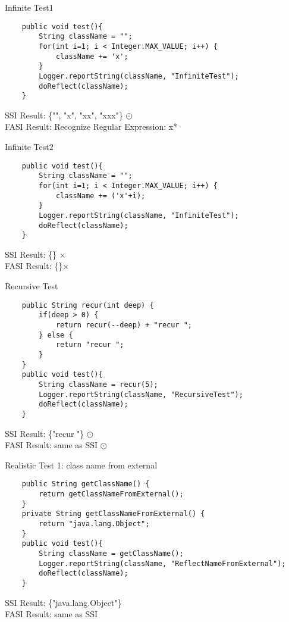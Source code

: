 \documentclass{beamer}
\begin{document}
\begin{frame}[fragile]{Infinite Test1}
\begin{lstlisting}
    public void test(){
        String className = "";
        for(int i=1; i < Integer.MAX_VALUE; i++) {
            className += 'x';
        }
        Logger.reportString(className, "InfiniteTest");
        doReflect(className);
    }
\end{lstlisting}
SSI Result: \{"", "x", "xx", "xxx"\} $\odot$\\
FASI Result: Recognize Regular Expression: x*  \checkmark
\end{frame}

\begin{frame}[fragile]{Infinite Test2}
\begin{lstlisting}
    public void test(){
        String className = "";
        for(int i=1; i < Integer.MAX_VALUE; i++) {
            className += ('x'+i);
        }
        Logger.reportString(className, "InfiniteTest");
        doReflect(className);
    }
\end{lstlisting}
SSI Result: \{\} $\times$\\
FASI Result: \{\}$\times$
\end{frame}

\begin{frame}[fragile]{Recursive Test}
\begin{lstlisting}
    public String recur(int deep) {
        if(deep > 0) {
            return recur(--deep) + "recur ";
        } else {
            return "recur ";
        }
    }
    public void test(){
        String className = recur(5);
        Logger.reportString(className, "RecursiveTest");
        doReflect(className);
    }
\end{lstlisting}
SSI Result: \{"recur "\} $\odot$\\
FASI Result: same as SSI $\odot$
\end{frame}

\begin{frame}[fragile]{Realistic Test 1: class name from external}
\begin{lstlisting}
    public String getClassName() {
        return getClassNameFromExternal();
    }
    private String getClassNameFromExternal() {
        return "java.lang.Object";
    }
    public void test(){
        String className = getClassName();
        Logger.reportString(className, "ReflectNameFromExternal");
        doReflect(className);
    }
\end{lstlisting}
SSI Result: \{"java.lang.Object"\} \checkmark\\
FASI Result: same as SSI \checkmark
\end{frame}
\end{document}
